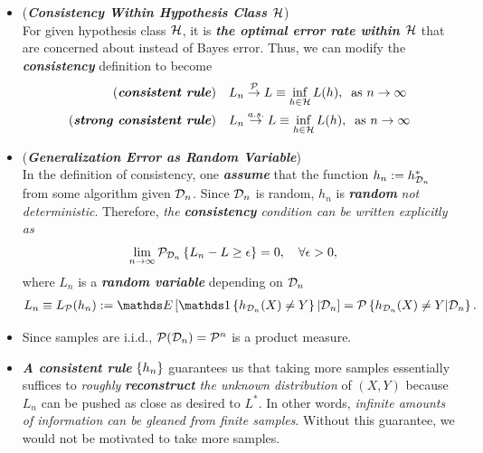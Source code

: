 \documentclass[11pt]{article}
\begin{document}
\begin{itemize}
\item \begin{remark} (\textbf{\emph{Consistency Within Hypothesis Class ${\mathcal H}$}}) \\
For given hypothesis class ${\mathcal H}$, it is  \emph{\textbf{the optimal error rate within ${\mathcal H}$}} that are concerned about  instead of Bayes error. Thus, we can modify the \emph{\textbf{consistency}} definition to become
\begin{align*}
\text{(\emph{\textbf{consistent rule}})}   && L_n &\stackrel{{\mathcal P}}{\rightarrow}  L\equiv  \inf_{h \in {\mathcal H}}L(h),\;\; \text{as } n\rightarrow \infty \\
\text{(\emph{\textbf{strong consistent rule}})} &&  L_n  &\stackrel{a.s.}{\rightarrow} L\equiv \inf_{h \in {\mathcal H}}L(h),\;\; \text{as } n\rightarrow \infty 
\end{align*}
\end{remark}


\item \begin{remark} (\textbf{\emph{Generalization Error as Random Variable}})\\
In the definition of consistency, one \emph{\textbf{assume}} that the function $h_n := h_{{\mathcal D}_n}^{*}$ from some algorithm given ${\mathcal D}_n$. Since ${\mathcal D}_n$ is random,  
$h_n$ is \emph{\textbf{random}} \emph{not deterministic}. Therefore,  \emph{the \textbf{consistency} condition can be written explicitly as} 
\begin{align*}
\lim\limits_{n\rightarrow \infty}{\mathcal P}_{{\mathcal D}_n}\left\{ L_n  - L\ge \epsilon\right\}&= 0, \quad  \forall \epsilon >0,
\end{align*} where $L_n$ is a \emph{\textbf{random variable}} depending on ${\mathcal D}_n$
\begin{align*}
L_n \equiv L_{\cP}(h_n) := \E{}{ \ind{h_{\cD_n}(X) \neq Y }| \cD_n} = \cP\set{h_{\cD_n}(X) \neq Y | \cD_n}.
\end{align*}
\end{remark}

\item \begin{remark}
Since samples are i.i.d., ${\mathcal P}({\mathcal D}_n) = {\mathcal P}^n$ is a product measure.
\end{remark}


\item \begin{remark}
\emph{\textbf{A consistent rule}} $\left\{h_n\right\}$ guarantees us that taking more samples essentially suffices to \emph{roughly} \emph{\textbf{reconstruct} the unknown distribution} of $(X, Y)$ because $L_n$ can be pushed as close as desired to $L^{*}$. In other words, \emph{infinite amounts of information can be gleaned from finite samples}. Without this guarantee, we would not be motivated to take more samples. 


\end{remark}
\end{itemize}
\end{document}
